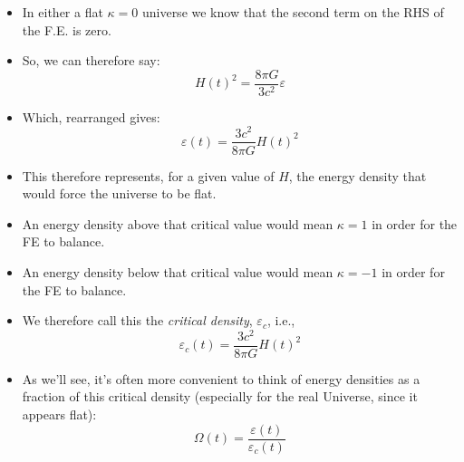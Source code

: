 \documentclass[11pt]{article}
\begin{document}
\begin{itemize}
\item In either a flat $\kappa=0$ universe we know that the second term on the RHS of the F.E. is zero.
\item So, we can therefore say:
\begin{equation}
H(t)^2 = \frac{8\pi G}{3c^2}\varepsilon
\end{equation}
\item Which, rearranged gives:
\begin{equation}
\varepsilon(t) = \frac{3c^2}{8\pi G}H(t)^2
\end{equation}    
\item This therefore represents, for a given value of $H$, the energy density that would force the universe to be flat.
\item An energy density above that critical value would mean $\kappa=1$ in order for the FE to balance.
\item An energy density below that critical value would mean $\kappa=-1$ in order for the FE to balance.
\item We therefore call this the {\it critical density}, $\varepsilon_c$, i.e.,
\begin{equation}
    \label{varep}
    \varepsilon_c(t) = \frac{3c^2}{8\pi G}H(t)^2
\end{equation}     
\item As we'll see, it's often more convenient to think of energy densities as a fraction of this critical density (especially for the real Universe, since it appears flat):
\begin{equation}
    \Omega(t) = \frac{\varepsilon(t)}{\varepsilon_c(t)}
\end{equation}    


\end{itemize}
\end{document}
